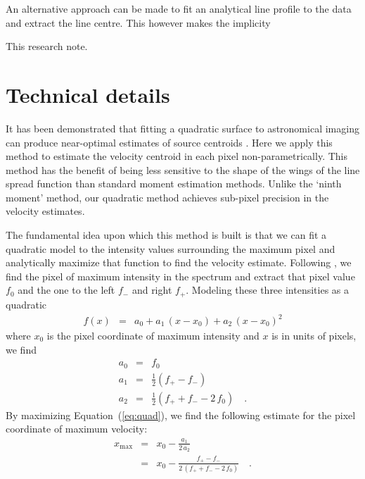 \documentclass[rnaas]{aastex62}
\renewcommand{\eqref}[1]{\ref{eq:#1}}
\newcommand{\Eq}[1]{Equation~(\eqref{#1})}
\newcommand{\eqlabel}[1]{\label{eq:#1}}
\begin{document}
An alternative approach can be made to fit an analytical line profile to the data and extract the line centre. This however makes the implicity

This research note. \citep{Perez:2018}

\section{Technical details}

It has been demonstrated that fitting a quadratic surface to astronomical
imaging can produce near-optimal estimates of source centroids
\citep{Vakili:2016}.
Here we apply this method to estimate the velocity centroid in each pixel
non-parametrically.
This method has the benefit of being less sensitive to the shape of the wings
of the line spread function than standard moment estimation methods.
Unlike the `ninth moment' method, our quadratic method achieves sub-pixel
precision in the velocity estimates.

The fundamental idea upon which this method is built is that we can fit a
quadratic model to the intensity values surrounding the maximum pixel and
analytically maximize that function to find the velocity estimate.
Following \citet{Vakili:2016}, we find the pixel of maximum intensity in the
spectrum and extract that pixel value $f_0$ and the one to the left $f_-$ and
right $f_+$.
Modeling these three intensities as a quadratic
\begin{eqnarray}
f(x) &=& a_0 + a_1\,(x-x_0) + a_2\,{(x-x_0)}^2
\eqlabel{quad}
\end{eqnarray}
where $x_0$ is the pixel coordinate of maximum intensity and $x$ is in units
of pixels, we find
\begin{eqnarray}
a_0 &=& f_0 \\
a_1 &=& \frac{1}{2}(f_+ - f_-) \\
a_2 &=& \frac{1}{2}(f_+ + f_- - 2\,f_0) \quad.
\end{eqnarray}
By maximizing \Eq{quad}, we find the following estimate for the pixel
coordinate of maximum velocity:
\begin{eqnarray}
x_\mathrm{max} &=& x_0 - \frac{a_1}{2\,a_2} \\
    &=& x_0 - \frac{f_+ - f_-}{2\,(f_+ + f_- - 2\,f_0)} \quad.
\end{eqnarray}
\end{document}
